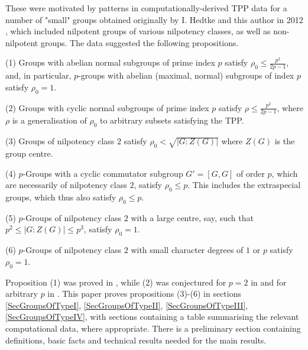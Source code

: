 \documentclass{amsart}
\theoremstyle{observation}
\theoremstyle{definition}
\theoremstyle{remark}
\numberwithin{equation}{section}
\begin{document}
These were motivated by patterns in computationally-derived TPP data for a number of "small" groups obtained originally by I. Hedtke and this author in 2012 \citep[Tables 1-4]{HM}, which included nilpotent groups of various nilpotency classes, as well as non-nilpotent groups. The data suggested the following propositions.

\textup{(1)} Groups with abelian normal subgroups of prime index $p$ satisfy $\rho_0 \leq \frac{p^2}{2p - 1}$, and, in particular, $p$-groups with abelian (maximal, normal) subgroups of index $p$ satisfy $\rho_0 = 1$.

\vspace{1mm}

\textup{(2)} Groups with cyclic normal subgroups of prime index $p$ satisfy $\rho \leq \frac{p^2}{2p - 1}$, where $\rho$ is a generalisation of $\rho_0$ to arbitrary subsets satisfying the TPP.

\vspace{1mm}

\textup{(3)} Groups of nilpotency class $2$ satisfy $\rho_0 < \sqrt{|G:Z(G)|}$ where $Z(G)$ is the group centre.

\vspace{1mm}

\textup{(4)} $p$-Groups with a cyclic commutator subgroup $G' = [G, G]$ of order $p$, which are necessarily of nilpotency class $2$, satisfy $\rho_0 \leq p$. This includes the extraspecial groups, which thus also satisfy $\rho_0 \leq p$.

\vspace{1mm}

\textup{(5)} $p$-Groups of nilpotency class $2$ with a large centre, say, such that $p^2 \leq |G:Z(G)| \leq p^3$, satisfy $\rho_0 = 1$. 

\vspace{1mm}

\textup{(6)} $p$-Groups of nilpotency class $2$ with small character degrees of $1$ or $p$ satisfy $\rho_0 = 1$.

\vspace{1mm}

Proposition \textup{(1)} was proved in \citep[Theorem 4.1, Corollary 4.3]{Mur}, while \textup{(2)} was conjectured for $p = 2$ in \citep[Conjecture 7.6]{HM} and for arbitrary $p$ in \citep[Conjecture 5.1]{Mur}. This paper proves propositions \textup{(3)-(6)} in sections \ref{SecGroupsOfTypeI}, \ref{SecGroupsOfTypeII}, \ref{SecGroupsOfTypeIII}, \ref{SecGroupsOfTypeIV}, with sections containing a table summarising the relevant computational data, where appropriate. There is a preliminary section containing definitions, basic facts and technical results needed for the main results.
\end{document}
